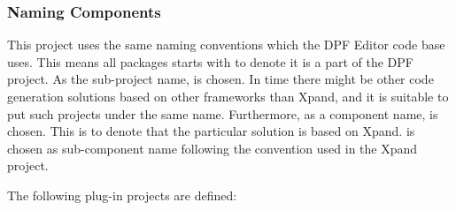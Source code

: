 \subsubsection{Naming Components}
This project uses the same naming conventions which the DPF Editor code base uses. This means all packages starts with  to denote it is a part of the DPF project. As the sub-project name,  is chosen. In time there might be other code generation solutions based on other frameworks than Xpand, and it is suitable to put such projects under the same name. Furthermore, as a component name,  is chosen. This is to denote that the particular solution is based on Xpand.  is chosen as sub-component name following the convention used in the Xpand project.
  
The following plug-in projects are defined:
\begin{description}
  \item[]
  \item[]
  \item[]
\end{description}
    
% 
% 

